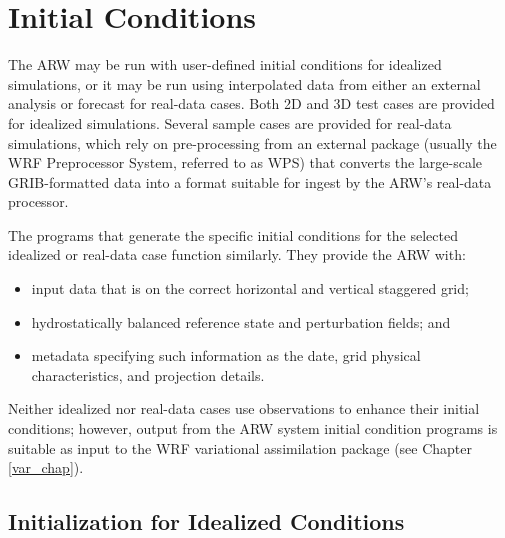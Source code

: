 \chapter{Initial Conditions}
\label{initialization_chap}

The ARW may be run with user-defined initial conditions 
for idealized simulations, or it may be run using
interpolated data from either an external analysis or forecast for
real-data cases.  Both 2D and 3D test cases are provided for idealized
simulations.  
Several sample cases are provided for real-data simulations, which
rely on pre-processing from an external package (usually the 
WRF Preprocessor System, referred to as WPS) that converts
the large-scale GRIB-formatted data into a format suitable for ingest by the ARW's
real-data processor.

The programs that generate the specific initial conditions for the selected 
idealized or real-data case function similarly. They provide the ARW with:
\begin{itemize}\setlength{\parskip}{-5pt}
\item input data that is on the correct horizontal and vertical staggered grid;
\item hydrostatically balanced reference state and perturbation fields; and
\item metadata specifying such information as the date, grid physical characteristics,
and projection details.
\end{itemize}
\noindent Neither idealized nor real-data cases use
observations to enhance their initial conditions; however, output from 
the ARW system initial condition programs is suitable as input to the WRF variational
assimilation package (see Chapter \ref{var_chap}).

\section{Initialization for Idealized Conditions}

